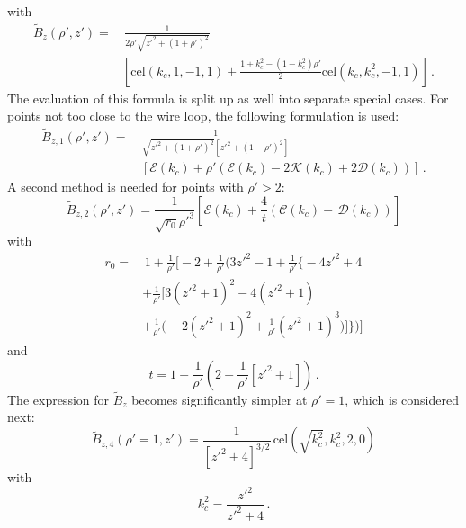 with
\begin{align}
  \tilde{B}_z(\rho', z')
  =&\, \frac{1}{2 \rho' \sqrt{z'^2 + (1 + \rho')^2}} \nonumber \\
 ~& \left[
       \textrm{cel}(k_c, 1, -1, 1)
     + \frac{1 + k_c^2 - \left( 1 - k_c^2 \right) \rho'}{2} \textrm{cel}(k_c, k_c^2, -1, 1)
   \right] \, .
\end{align}
The evaluation of this formula is split up as well into separate special cases.
For points not too close to the wire loop,
the following formulation is used:
\begin{align}
  \tilde{B}_{z,1} (\rho', z')
  =&\, \frac{1}{\sqrt{{z'}^2 + (1+\rho')^2} \left[{z'}^2 + (1 - \rho')^2 \right] } \nonumber \\
  ~&\,  \left[ \mathcal{E}(k_c) + \rho' \left( \mathcal{E}(k_c) - 2 \mathcal{K}(k_c) + 2 \mathcal{D}(k_c) \right) \right] \, . \label{eqn:cwl_B_z_f1}
\end{align}
A second method is needed for points with $\rho' > 2$:
\begin{equation}
  \tilde{B}_{z,2} (\rho', z')
  = \frac{1}{\sqrt{r_0} {\rho'}^3}
    \left[ \mathcal{E}(k_c) + \frac{4}{t} \left( \mathcal{C}(k_c) - \,\mathcal{D}(k_c) \right) \right]
\end{equation}
with
\begin{align}
  r_0
  = &\,             1 + \frac{1}{\rho'} \Biggl[
                  - 2 + \frac{1}{\rho'} \Biggl(
         3 {z'}^2 - 1 + \frac{1}{\rho'} \Biggl\{
       - 4 {z'}^2 + 4 \nonumber \\
  ~& + \frac{1}{\rho'} \Biggl[ 3 \left( {z'}^2 + 1 \right)^2 - 4 \left( {z'}^2 + 1 \right) \nonumber \\
  ~& + \frac{1}{\rho'} \Biggl(-2 \left( {z'}^2 + 1 \right)^2 + \frac{1}{\rho'} \left( {z'}^2 + 1 \right)^3
       \Biggr)
       \Biggr]
       \Biggr\}
       \Biggr)
       \Biggr]
\end{align}
and
\begin{equation}
  t = 1 + \frac{1}{\rho'} \left( 2 + \frac{1}{\rho'} \left[ {z'}^2 + 1 \right] \right) \, .
\end{equation}
The expression for $\tilde{B}_z$ becomes significantly simpler at $\rho'=1$,
which is considered next:
\begin{equation}
  \tilde{B}_{z,4} (\rho'=1, z')
  = \frac{1}{\left[ {z'}^2 + 4 \right]^{3/2}} \,\mathrm{cel}(\sqrt{k_c^2}, k_c^2, 2, 0)
\end{equation}
with
\begin{equation}
  k_c^2 = \frac{{z'}^2}{{z'}^2 + 4} \, .
\end{equation}
